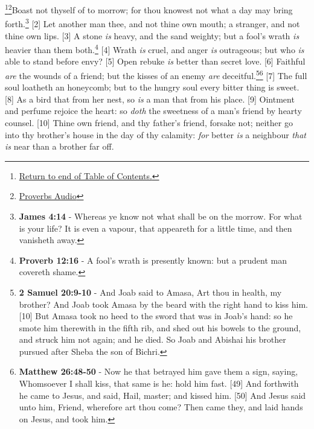 \footnote{\textcolor[cmyk]{0.99998,1,0,0}{\hyperlink{TOC}{Return to end of Table of Contents.}}}\footnote{\href{https://audiobible.com/bible/}{\textcolor[cmyk]{0.99998,1,0,0}{Proverbs Audio}}}\textcolor[cmyk]{0.99998,1,0,0}{Boast not thyself of to morrow; for thou knowest not what a day may bring forth.}\footnote{\textbf{James 4:14} -  Whereas ye know not what shall be on the morrow. For what is your life? It is even a vapour, that appeareth for a little time, and then vanisheth away.}
[2] \textcolor[cmyk]{0.99998,1,0,0}{Let another man  thee, and not thine own mouth; a stranger, and not thine own lips.}
[3] \textcolor[cmyk]{0.99998,1,0,0}{A stone \emph{is} heavy, and the sand weighty; but a fool's wrath \emph{is} heavier than them both.}\footnote{\textbf{Proverb 12:16} - A fool’s wrath is presently known: but a prudent man covereth shame.}
[4] \textcolor[cmyk]{0.99998,1,0,0}{Wrath \emph{is} cruel, and anger \emph{is} outrageous; but who \emph{is} able to stand before envy?}
[5] \textcolor[cmyk]{0.99998,1,0,0}{Open rebuke \emph{is} better than secret love.}
[6] \textcolor[cmyk]{0.99998,1,0,0}{Faithful \emph{are} the wounds of a friend; but the kisses of an enemy \emph{are} deceitful.}\footnote{\textbf{2 Samuel 20:9-10} - And Joab said to Amasa, Art thou in health, my brother? And Joab took Amasa by the beard with the right hand to kiss him. [10] But Amasa took no heed to the sword that was in Joab’s hand: so he smote him therewith in the fifth rib, and shed out his bowels to the ground, and struck him not again; and he died. So Joab and Abishai his brother pursued after Sheba the son of Bichri.}\footnote{\textbf{Matthew 26:48-50} - Now he that betrayed him gave them a sign, saying, Whomsoever I shall kiss, that same is he: hold him fast. [49] And forthwith he came to Jesus, and said, Hail, master; and kissed him. [50] And Jesus said unto him, \textcolor{myRed}{Friend, wherefore art thou come?} Then came they, and laid hands on Jesus, and took him.}
[7] \textcolor[cmyk]{0.99998,1,0,0}{The full soul loatheth an honeycomb; but to the hungry soul every bitter thing is sweet.}
[8] \textcolor[cmyk]{0.99998,1,0,0}{As a bird that  from her nest, so \emph{is} a man that  from his place.}
[9] \textcolor[cmyk]{0.99998,1,0,0}{Ointment and perfume rejoice the heart: so \emph{doth} the sweetness of a man's friend by hearty counsel.}
[10] \textcolor[cmyk]{0.99998,1,0,0}{Thine own friend, and thy father's friend, forsake not; neither go into thy brother's house in the day of thy calamity: \emph{for} better \emph{is} a neighbour \emph{that} \emph{is} near than a brother far off.}
